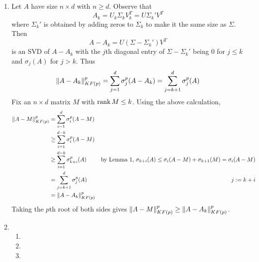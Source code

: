\documentclass{article}
\renewcommand{\S}{\Sigma}
\newcommand{\s}{\sigma}
\begin{document}
\begin{enumerate}
	\item Let $A$ have size $n\times d$ with $n\ge d$. Observe that
	\[A_k = U_k\S_kV_k^T = U\S_k'V^T\]
	where $\S_k'$ is obtained by adding zeros to $\S_k$ to make it the same size as $\S$. Then
	\[A - A_k = U(\S-\S_k')V^T\]
	is an SVD of $A-A_k$ with the $j$th diagonal entry of $\S-\S_k'$ being 0 for $j\le k$ and $\s_j(A)$ for $j>k$. Thus
	\[\norm{A-A_k}_{KF(p)}^p = \sum_{j=1}^d \s_j^p(A-A_k) = \sum_{j=k+1}^d \s_j^p(A)\]
	Fix an $n\times d$ matrix $M$ with $\rank M\le k$. Using the above calculation,
	\begin{align*}
		\norm{A-M}_{KF(p)}^p &= \sum_{i=1}^d \s_i^p(A-M) \\
		&\ge \sum_{i=1}^{d-k}\s_i^p(A-M) \\
		&\ge \sum_{i=1}^{d-k}\s_{k+i}^p(A) & \text{by Lemma 1, } \s_{k+i}(A) \le \s_i(A-M) + \s_{k+1}(M) = \s_i(A-M) \\
		&= \sum_{j=k+1}^d \s_j^p(A) & j := k+i \\
		&= \norm{A-A_k}_{KF(p)}^p
	\end{align*}
	Taking the $p$th root of both sides gives $\norm{A-M}_{KF(p)}^p \ge \norm{A-A_k}_{KF(p)}^p$.



	\pagebreak
	
	
	
	\item
	
	\begin{enumerate}
		
		
		
		\item 
		
		
		
		\item
		
		
		
		\item
		
		
		
	\end{enumerate}
	
	
	
\end{enumerate}

	
	
\end{document}

